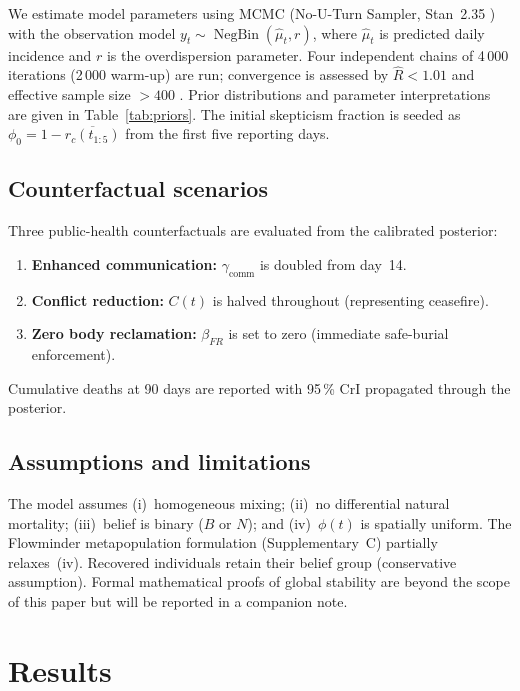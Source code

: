 \documentclass[12pt,a4paper]{article}
\begin{document}
We estimate model parameters using MCMC (No-U-Turn Sampler, Stan~2.35
\citep{Carpenter2017}) with the observation model
$y_t \sim \operatorname{NegBin}(\hat\mu_t, r)$, where $\hat\mu_t$ is
predicted daily incidence and $r$ is the overdispersion parameter. Four
independent chains of 4\,000 iterations (2\,000 warm-up) are run; convergence
is assessed by $\widehat{R}<1.01$ and effective sample size $>400$
\citep{Gelman2013}. Prior distributions and parameter interpretations are
given in Table~\ref{tab:priors}. The initial skepticism fraction is seeded
as $\phi_0 = 1 - \overline{r_c(t_{1:5})}$ from the first five reporting days.

\subsection{Counterfactual scenarios}

Three public-health counterfactuals are evaluated from the calibrated
posterior:
\begin{enumerate}[label=\textbf{S\arabic*}, leftmargin=2em]
  \item \textbf{Enhanced communication:}
        $\gamma_{\text{comm}}$ is doubled from day~14.
  \item \textbf{Conflict reduction:}
        $C(t)$ is halved throughout (representing ceasefire).
  \item \textbf{Zero body reclamation:}
        $\beta_{FR}$ is set to zero (immediate safe-burial enforcement).
\end{enumerate}
Cumulative deaths at 90 days are reported with 95\,\% CrI propagated
through the posterior.

\subsection{Assumptions and limitations}

The model assumes (i)~homogeneous mixing; (ii)~no differential natural
mortality; (iii)~belief is binary ($B$ or $N$); and (iv)~$\phi(t)$ is
spatially uniform. The Flowminder metapopulation formulation
(Supplementary~C) partially relaxes~(iv). Recovered individuals retain
their belief group (conservative assumption). Formal mathematical proofs
of global stability are beyond the scope of this paper but will be reported
in a companion note.

\section{Results}
\end{document}
